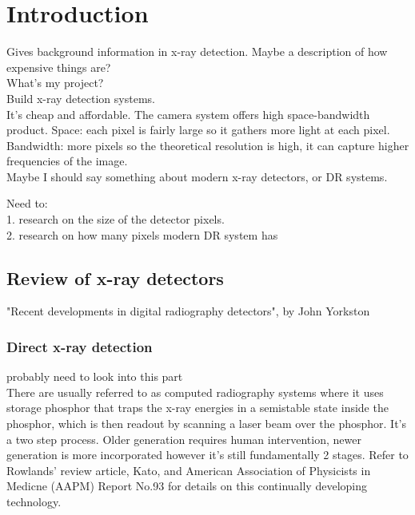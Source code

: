 \chapter{Introduction}
Gives background information in x-ray detection. Maybe a description of how expensive things are? \\
What's my project?\\
	Build x-ray detection systems.\\
	It's cheap and affordable.  The camera system offers high space-bandwidth product.  Space: each pixel is fairly large so it gathers more light at each pixel. Bandwidth: more pixels so the theoretical resolution is high, it can capture higher frequencies of the image.\\
	Maybe I should say something about modern x-ray detectors, or DR systems.
	
	
Need to:\\
	1. research on the size of the detector pixels.\\
	2. research on how many pixels modern DR system has\\


\section{Review of x-ray detectors}
	"Recent developments in digital radiography detectors", by John Yorkston\\
\subsection{Direct x-ray detection}
	probably need to look into this part~\citep{Kim2008}\\
	There are usually referred to as computed radiography systems where it uses storage phosphor that traps the x-ray energies in a semistable state inside the phosphor, which is then readout by scanning a laser beam over the phosphor.  It's a two step process.  Older generation requires human intervention, newer generation is more incorporated however it's still fundamentally 2 stages.  Refer to Rowlands' review article, Kato, and American Association of Physicists in Medicne (AAPM) Report No.93 for details on this continually developing technology.
	
